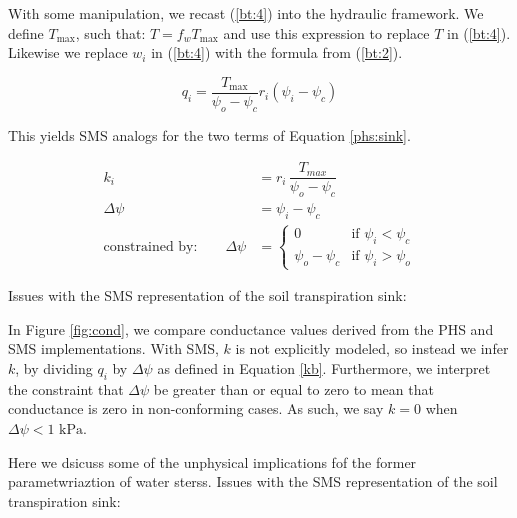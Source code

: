 \documentclass[draft,linenumbers]{agujournal}
\begin{document}
    With some manipulation, we recast (\ref{bt:4}) into the hydraulic framework. We define $T_{\text{max}}$, such that: $T = 
    f_w T_{\text{max}}$ and use this expression to replace $T$ in (\ref{bt:4}).  Likewise we replace $w_i$ in (\ref{bt:4}) with the 
    formula from (\ref{bt:2}).
    
    \begin{linenomath*}
    \begin{equation} 
    q_i = \dfrac{T_{\text{max}}}{\psi_{o}-\psi_{c}} r_i \left(\psi_i-\psi_{c} \right)
    \end{equation}
    \end{linenomath*}
    
    This yields SMS analogs for the two terms of Equation \ref{phs:sink}.
    \begin{linenomath*}
    \begin{equation} \begin{aligned}
    k_i &= r_i \, \dfrac{T_{max}}{\psi_{o}-\psi_{c}} \\
    \Delta\psi &= \psi_i - \psi_{c} \\
    \mbox{constrained by:} \qquad
    \Delta\psi &=
    \begin{cases}
    0                          & \text{if } \psi_i<\psi_{c}  \\
    \psi_{o}-\psi_{c} & \text{if } \psi_i>\psi_{o}
    \label{kb}
    \end{cases}
    \end{aligned}\end{equation}
    \end{linenomath*}

    Issues with the SMS representation of the soil transpiration sink: 

    In Figure \ref{fig:cond}, we compare conductance values derived from the PHS and SMS implementations.
    With SMS, $k$ is not explicitly modeled, so instead we infer $k$, 
    by dividing $q_i$ by $\Delta\psi$ as defined in Equation \ref{kb}.
    Furthermore, we interpret the constraint that $\Delta\psi$ be greater than or equal to zero to mean 
    that conductance is zero in non-conforming cases. As such, we say $k=0$ when $\Delta\psi<\text{1 kPa}$.
    
    Here we dsicuss some of the unphysical implications fof the former parametwriaztion of water sterss. Issues with the SMS representation of the soil transpiration sink: 
    
\end{document}

